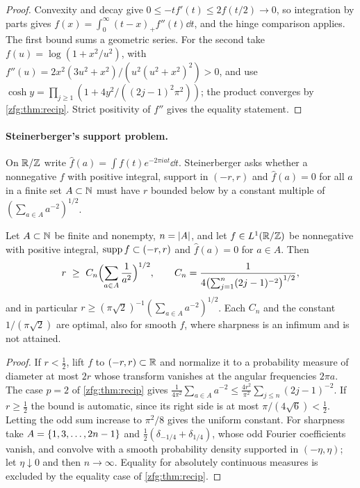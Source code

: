 \begin{proof}
Convexity and decay give $0\le-tf'(t)\le2f(t/2)\to0$, so integration by parts gives $f(x)=\int_0^\infty(t-x)_+f''(t)\dd t$, and the
hinge comparison applies. The first bound sums a geometric series. For the second take $f(u)=\log(1+x^2/u^2)$, with
$f''(u)=2x^2(3u^2+x^2)/(u^2(u^2+x^2)^2)>0$, and use $\cosh y=\prod_{j\ge1}(1+4y^2/((2j-1)^2\pi^2))$; the product converges by
\cref{zfg:thm:recip}. Strict positivity of $f''$ gives the equality statement.
\end{proof}

\paragraph{Steinerberger's support problem.}
On $\mathbb{R}/\mathbb{Z}$ write $\widehat f(a)=\int f(t)e^{-2\pi iat}\dd t$. Steinerberger \cite[Problem~41, \emph{A kind of uncertainty
principle?}]{Steinerberger2026Open} asks whether a nonnegative $f$ with positive integral, support in $(-r,r)$ and
$\widehat f(a)=0$ for all $a$ in a finite set $A\subset\mathbb{N}$ must have $r$ bounded below by a constant multiple of
$(\sum_{a\in A}a^{-2})^{1/2}$.

\begin{theorem}\label{zfg:thm:support}
Let $A\subset\mathbb{N}$ be finite and nonempty, $n=\lvert A\rvert$, and let $f\in L^1(\mathbb{R}/\mathbb{Z})$ be nonnegative with positive integral,
$\operatorname{supp} f\subset(-r,r)$ and $\widehat f(a)=0$ for $a\in A$. Then
\[
 r\ \ge\ C_n\Bigl(\sum_{a\in A}\frac1{a^2}\Bigr)^{1/2},\qquad C_n=\frac1{4\bigl(\sum_{j=1}^n(2j-1)^{-2}\bigr)^{1/2}},
\]
and in particular $r\ge(\pi\sqrt2)^{-1}(\sum_{a\in A}a^{-2})^{1/2}$. Each $C_n$ and the constant $1/(\pi\sqrt2)$ are optimal, also for smooth $f$,
where sharpness is an infimum and is not attained.
\end{theorem}

\begin{proof}
If $r<\tfrac12$, lift $f$ to $(-r,r)\subset\mathbb{R}$ and normalize it to a probability measure of diameter at most $2r$ whose transform
vanishes at the angular frequencies $2\pi a$. The case $p=2$ of \cref{zfg:thm:recip} gives
$\tfrac1{4\pi^2}\sum_{a\in A}a^{-2}\le\tfrac{4r^2}{\pi^2}\sum_{j\le n}(2j-1)^{-2}$. If $r\ge\tfrac12$ the bound is automatic, since its right
side is at most $\pi/(4\sqrt6)<\tfrac12$. Letting the odd sum increase to $\pi^2/8$ gives the uniform constant. For sharpness take
$A=\{1,3,\dots,2n-1\}$ and $\tfrac12(\delta_{-1/4}+\delta_{1/4})$, whose odd Fourier coefficients vanish, and convolve with a smooth
probability density supported in $(-\eta,\eta)$; let $\eta\downarrow0$ and then $n\to\infty$. Equality for absolutely continuous
measures is excluded by the equality case of \cref{zfg:thm:recip}.
\end{proof}

